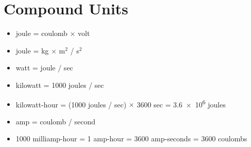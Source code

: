 \documentclass[10pt]{article}
\begin{document}
\section{Compound Units}

\begin{itemize}
    \item joule = coulomb $\times$ volt
    \item joule = kg $\times$ m$^{2}$ / s$^{2}$
    \item watt = joule / sec
    \item kilowatt = 1000 joules / sec
    \item kilowatt-hour = (1000 joules / sec) $\times$ 3600 sec = \num{3.6e6} joules
    \item amp = coulomb / second
    \item 1000 milliamp-hour = 1 amp-hour = 3600 amp-seconds = 3600 coulombs
\end{itemize}









\newpage
{

}
\end{document}
